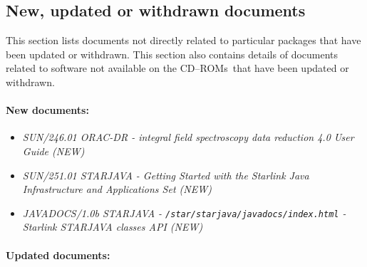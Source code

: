 \documentclass[twoside,11pt]{article}
\newcommand{\xref}[3]{#1}
\renewcommand{\_}{\texttt{\symbol{95}}}
\newcommand{\cdroms}{CD--ROMs}
\newcommand{\cdroms}{CD-ROMs}
\begin{document}
\subsection{New, updated or withdrawn documents}

This section lists documents not directly related to particular packages that
have been updated or withdrawn.  This section also contains details of documents
related to software not available on the \cdroms\ that have been updated
or withdrawn.

\paragraph{New documents:}


\begin{itemize}
\item \textit{\xref{SUN/246.01 ORAC-DR - integral field spectroscopy data 
reduction 4.0 User Guide (NEW)}{sun246}{}\/}

\item \textit{\xref{SUN/251.01 STARJAVA - Getting Started with the Starlink Java 
Infrastructure and Applications Set (NEW)}{sun251}{}\/}

\item \textit{JAVADOCS/1.0b STARJAVA - \texttt{/star/starjava/javadocs/index.html} -\\ 
Starlink STARJAVA classes API (NEW)}

\end{itemize}


\paragraph{Updated documents:}
\end{document}
